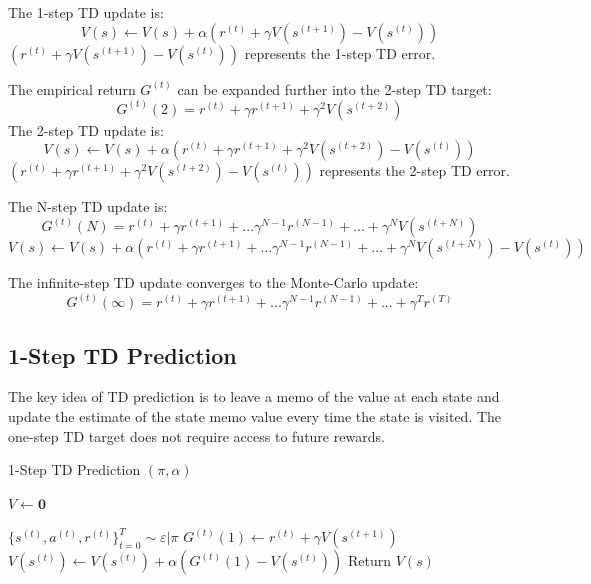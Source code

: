 \documentclass[11pt]{article}
\begin{document}
The 1-step TD update is:
\begin{equation}
    V(s) \leftarrow V(s) + \alpha(r^{(t)} + \gamma V(s^{(t+1)})-V(s^{(t)}))
\end{equation}
$(r^{(t)} + \gamma V(s^{(t+1)})-V(s^{(t)}))$ represents the 1-step TD error.

The empirical return $G^{(t)}$ can be expanded further into the 2-step TD target:
\begin{equation}
    G^{(t)}(2) = r^{(t)} + \gamma r^{(t+1)} + \gamma^2 V(s^{(t+2)})
\end{equation}
The 2-step TD update is:
\begin{equation}
    V(s) \leftarrow V(s) + \alpha(r^{(t)} + \gamma r^{(t+1)} + \gamma^2 V(s^{(t+2)})-V(s^{(t)}))
\end{equation}
$(r^{(t)} + \gamma r^{(t+1)} + \gamma^2 V(s^{(t+2)})-V(s^{(t)}))$ represents the 2-step TD error.

The N-step TD update is:
\begin{equation}
    G^{(t)}(N) = r^{(t)} + \gamma r^{(t+1)}+...\gamma^{N-1} r^{(N-1)}+... + \gamma^N V(s^{(t+N)})
\end{equation}
\begin{equation}
    V(s) \leftarrow V(s) + \alpha(r^{(t)} + \gamma r^{(t+1)}+...\gamma^{N-1} r^{(N-1)}+... + \gamma^N V(s^{(t+N)})-V(s^{(t)}))
\end{equation}


The infinite-step TD update converges to the Monte-Carlo update:
\begin{equation}
    G^{(t)}(\infty) = r^{(t)} + \gamma r^{(t+1)}+...\gamma^{N-1} r^{(N-1)}+... + \gamma^T r^{(T)}
\end{equation}

\subsection{1-Step TD Prediction}
The key idea of TD prediction is to leave a memo of the value at each state and update the estimate of the state memo value every time the state is visited. 
The one-step TD target does not require access to future rewards.
\begin{algorithm}[H]
\caption{1-Step TD Prediction $(\pi, \alpha)$}
\label{algo:1TD}
\begin{algorithmic}[1]
\STATE $V \leftarrow \mathbf{0}$ \hfill
{}

\STATE $\{s^{(t)}, a^{(t)}, r^{(t)}\}_{t=0}^T \sim \varepsilon|\pi$ \hfill 
{}
\STATE $G^{(t)}(1) \leftarrow r^{(t)}+ \gamma V(s^{(t+1)})$ \hfill 
\STATE $V(s^{(t)}) \leftarrow V(s^{(t)}) + \alpha(G^{(t)}(1)-V(s^{(t)}))$  \hfill
\ENDFOR
\ENDFOR
\STATE Return $V(s)$  \hfill
\end{algorithmic}
\end{algorithm}
\end{document}
